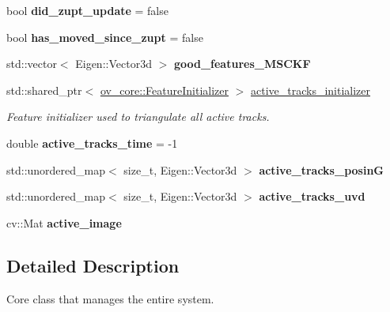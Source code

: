 \begin{DoxyCompactItemize}
bool {\bfseries did\+\_\+zupt\+\_\+update} = false
\item 
\mbox{\label{classov__msckf_1_1VioManager_a3450b4297050f1018765c7939bf00d7f}} 
bool {\bfseries has\+\_\+moved\+\_\+since\+\_\+zupt} = false
\item 
\mbox{\label{classov__msckf_1_1VioManager_a40926fd6cbd206a7e87fc3042782f222}} 
std\+::vector$<$ Eigen\+::\+Vector3d $>$ {\bfseries good\+\_\+features\+\_\+\+M\+S\+C\+KF}
\item 
\mbox{\label{classov__msckf_1_1VioManager_a7a541d7d6baedd02147a851436f897c0}} 
std\+::shared\+\_\+ptr$<$ \hyperlink{classov__core_1_1FeatureInitializer}{ov\+\_\+core\+::\+Feature\+Initializer} $>$ \hyperlink{classov__msckf_1_1VioManager_a7a541d7d6baedd02147a851436f897c0}{active\+\_\+tracks\+\_\+initializer}
\begin{DoxyCompactList}\small\item\em Feature initializer used to triangulate all active tracks. \end{DoxyCompactList}\item 
\mbox{\label{classov__msckf_1_1VioManager_a27b558310fe30c4396ce13bcaae50bbc}} 
double {\bfseries active\+\_\+tracks\+\_\+time} = -\/1
\item 
\mbox{\label{classov__msckf_1_1VioManager_a19929a92cf2148f4854ee5741bcaed96}} 
std\+::unordered\+\_\+map$<$ size\+\_\+t, Eigen\+::\+Vector3d $>$ {\bfseries active\+\_\+tracks\+\_\+posinG}
\item 
\mbox{\label{classov__msckf_1_1VioManager_ac573da3687258c50f21c2c973f6554e0}} 
std\+::unordered\+\_\+map$<$ size\+\_\+t, Eigen\+::\+Vector3d $>$ {\bfseries active\+\_\+tracks\+\_\+uvd}
\item 
\mbox{\label{classov__msckf_1_1VioManager_a2b1138ae43c6c7adc9c79ac0639a637c}} 
cv\+::\+Mat {\bfseries active\+\_\+image}
\end{DoxyCompactItemize}


\subsection{Detailed Description}
Core class that manages the entire system. 

